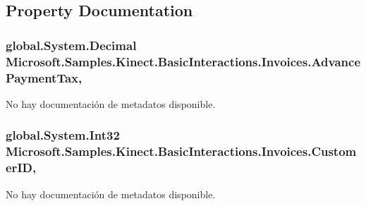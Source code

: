 \subsection{Property Documentation}
\hypertarget{class_microsoft_1_1_samples_1_1_kinect_1_1_basic_interactions_1_1_invoices_a784526576e4b9e719b01da305f9bbd48}{
\subsubsection[{Advance\-Payment\-Tax}]{\setlength{\rightskip}{0pt plus 5cm}global.\-System.\-Decimal Microsoft.\-Samples.\-Kinect.\-Basic\-Interactions.\-Invoices.\-Advance\-Payment\-Tax\hspace{0.3cm}{\ttfamily [get]}, {\ttfamily [set]}}}\label{class_microsoft_1_1_samples_1_1_kinect_1_1_basic_interactions_1_1_invoices_a784526576e4b9e719b01da305f9bbd48}


No hay documentación de metadatos disponible. 

\hypertarget{class_microsoft_1_1_samples_1_1_kinect_1_1_basic_interactions_1_1_invoices_a5eab4d8c701a9f60d2399f326d160e2a}{
\subsubsection[{Customer\-I\-D}]{\setlength{\rightskip}{0pt plus 5cm}global.\-System.\-Int32 Microsoft.\-Samples.\-Kinect.\-Basic\-Interactions.\-Invoices.\-Customer\-I\-D\hspace{0.3cm}{\ttfamily [get]}, {\ttfamily [set]}}}\label{class_microsoft_1_1_samples_1_1_kinect_1_1_basic_interactions_1_1_invoices_a5eab4d8c701a9f60d2399f326d160e2a}


No hay documentación de metadatos disponible. 

